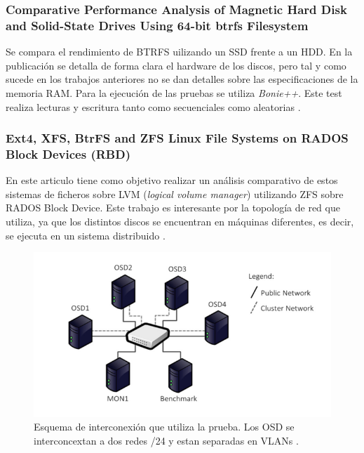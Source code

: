  \subsubsection{Comparative Performance Analysis of Magnetic Hard Disk and Solid-State Drives Using 64-bit btrfs Filesystem} 
 Se compara el rendimiento de BTRFS uilizando un SSD frente a un HDD. En la publicación se detalla de forma clara el hardware de los discos, pero tal y como sucede en los trabajos anteriores no se dan detalles sobre las especificaciones de la memoria RAM. Para la ejecución de las pruebas se utiliza \textit{Bonie++}. Este test realiza lecturas y escritura tanto como secuenciales como aleatorias \cite{Stojkov2016ComparativePA}.
    
\subsubsection{Ext4, XFS, BtrFS and ZFS Linux File Systems on RADOS Block Devices (RBD)} 
En este articulo tiene como objetivo realizar un análisis comparativo de estos sistemas de ficheros sobre LVM (\textit{logical volume manager}) utilizando ZFS sobre RADOS Block Device. Este trabajo es interesante por la topología de red que utiliza, ya que los distintos discos se encuentran en máquinas diferentes, es decir, se ejecuta en un sistema distribuido \cite{7881982}. 

\begin{figure}[H]
    \centering
    \includegraphics[scale=0.5]{doc/assets/images/Capitulo2/Esquema_conexion_EA.png}
    \caption{Esquema de interconexión que utiliza la prueba. Los OSD se interconcextan a dos redes /24 y estan separadas en VLANs \cite{7881982}.}
\end{figure}

